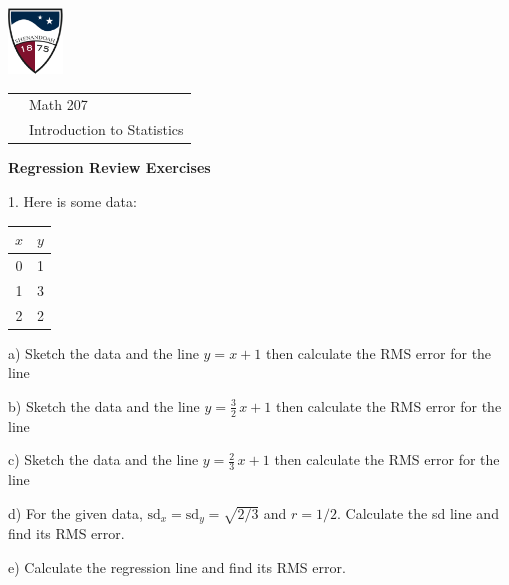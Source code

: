 \documentclass[10pt]{article}
\begin{document}
\pagestyle{empty}
\lstset{language=R, showspaces=false, showstringspaces=false}

\href{http://www.su.edu}{\includegraphics[height=1.75cm]{sulogo.eps}}
\vspace{-1.69cm}

{\small \hfill
\begin{tabular}{cl}
& Math 207\\
& Introduction to  Statistics\\
\end{tabular}
}
\setlength{\baselineskip}{1.05\baselineskip}

\begin{center}
\textbf{\large  Regression Review Exercises}
\end{center}

1. Here is some data:
\begin{center}
\begin{tabular}{cc}
$x$ & $y$\\\hline
0   & 1\\
1   & 3\\
2   & 2
\end{tabular}
\end{center}

\hspace{10pt} a) Sketch the data and the line $y=x+1$ then calculate the RMS error for the line 
\vspace{1.4in}

\hspace{10pt} b) Sketch the data and the line $y=\frac{3}{2}\,x+1$ 
then calculate the RMS error for the line 
\vspace{1.3in}

\hspace{10pt} c) Sketch the data and the line $y=\frac{2}{3}\,x+1$ 
then calculate the RMS error for the line 
\vspace{1.3in}

\hspace{10pt} d) For the given data, $\mbox{sd}_x=\mbox{sd}_y=\sqrt{2/3}$ and $r=1/2$.
Calculate
the {sd} line and find its RMS error.
\vspace{1.4in}

\hspace{10pt} e) Calculate the regression line and find its RMS error.  
\vfill
\eject
\end{document}
